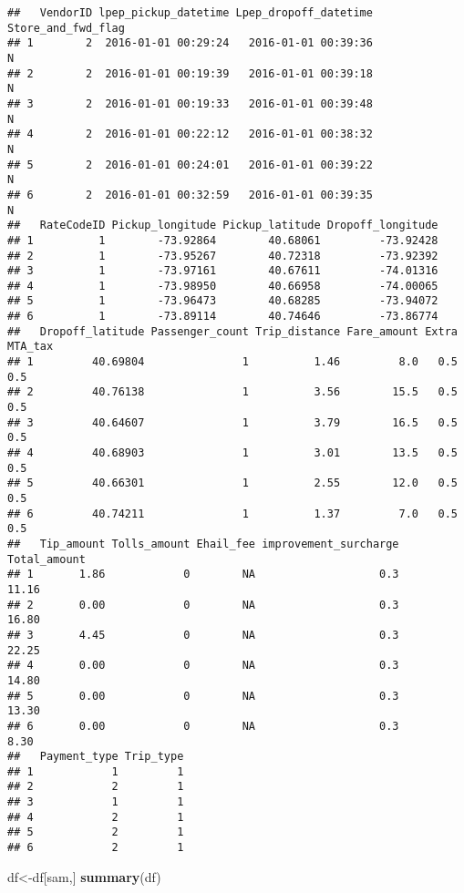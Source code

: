 \documentclass[
  18pt,
  a4paper]{article}
\newenvironment{Shaded}{\begin{snugshade}}{\end{snugshade}}
\newcommand{\KeywordTok}[1]{\textcolor[rgb]{0.13,0.29,0.53}{\textbf{#1}}}
\newcommand{\NormalTok}[1]{#1}
\begin{document}
\begin{verbatim}
##   VendorID lpep_pickup_datetime Lpep_dropoff_datetime Store_and_fwd_flag
## 1        2  2016-01-01 00:29:24   2016-01-01 00:39:36                  N
## 2        2  2016-01-01 00:19:39   2016-01-01 00:39:18                  N
## 3        2  2016-01-01 00:19:33   2016-01-01 00:39:48                  N
## 4        2  2016-01-01 00:22:12   2016-01-01 00:38:32                  N
## 5        2  2016-01-01 00:24:01   2016-01-01 00:39:22                  N
## 6        2  2016-01-01 00:32:59   2016-01-01 00:39:35                  N
##   RateCodeID Pickup_longitude Pickup_latitude Dropoff_longitude
## 1          1        -73.92864        40.68061         -73.92428
## 2          1        -73.95267        40.72318         -73.92392
## 3          1        -73.97161        40.67611         -74.01316
## 4          1        -73.98950        40.66958         -74.00065
## 5          1        -73.96473        40.68285         -73.94072
## 6          1        -73.89114        40.74646         -73.86774
##   Dropoff_latitude Passenger_count Trip_distance Fare_amount Extra MTA_tax
## 1         40.69804               1          1.46         8.0   0.5     0.5
## 2         40.76138               1          3.56        15.5   0.5     0.5
## 3         40.64607               1          3.79        16.5   0.5     0.5
## 4         40.68903               1          3.01        13.5   0.5     0.5
## 5         40.66301               1          2.55        12.0   0.5     0.5
## 6         40.74211               1          1.37         7.0   0.5     0.5
##   Tip_amount Tolls_amount Ehail_fee improvement_surcharge Total_amount
## 1       1.86            0        NA                   0.3        11.16
## 2       0.00            0        NA                   0.3        16.80
## 3       4.45            0        NA                   0.3        22.25
## 4       0.00            0        NA                   0.3        14.80
## 5       0.00            0        NA                   0.3        13.30
## 6       0.00            0        NA                   0.3         8.30
##   Payment_type Trip_type
## 1            1         1
## 2            2         1
## 3            1         1
## 4            2         1
## 5            2         1
## 6            2         1
\end{verbatim}

\begin{Shaded}
\begin{Highlighting}[]
\NormalTok{df<-df[sam,]}
\KeywordTok{summary}\NormalTok{(df)}
\end{Highlighting}
\end{Shaded}
\end{document}
